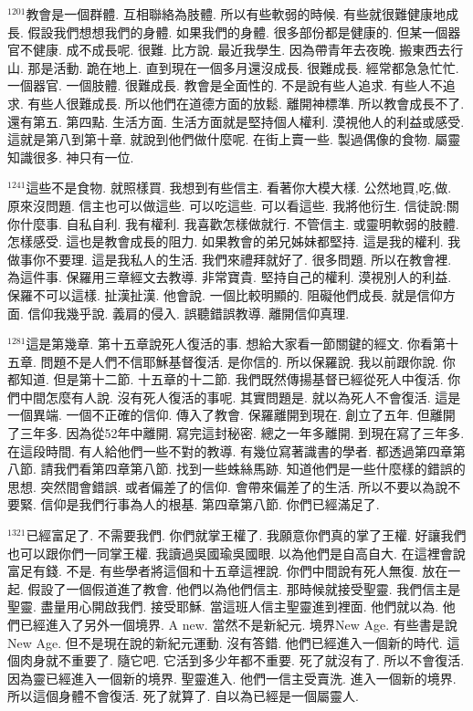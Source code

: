 \documentclass{book}
\begin{document}
$^{1201}$教會是一個群體.
互相聯絡為肢體.
所以有些軟弱的時候.
有些就很難健康地成長.
假設我們想想我們的身體.
如果我們的身體.
很多部份都是健康的.
但某一個器官不健康.
成不成長呢.
很難.
比方說.
最近我學生.
因為帶青年去夜晚.
搬東西去行山.
那是活動.
跪在地上.
直到現在一個多月還沒成長.
很難成長.
經常都急急忙忙.
一個器官.
一個肢體.
很難成長.
教會是全面性的.
不是說有些人追求.
有些人不追求.
有些人很難成長.
所以他們在道德方面的放鬆.
離開神標準.
所以教會成長不了.
還有第五.
第四點.
生活方面.
生活方面就是堅持個人權利.
漠視他人的利益或感受.
這就是第八到第十章.
就說到他們做什麼呢.
在街上賣一些.
製過偶像的食物.
屬靈知識很多.
神只有一位.

$^{1241}$這些不是食物.
就照樣買.
我想到有些信主.
看著你大模大樣.
公然地買,吃,做.
原來沒問題.
信主也可以做這些.
可以吃這些.
可以看這些.
我將他衍生.
信徒說:關你什麼事.
自私自利.
我有權利.
我喜歡怎樣做就行.
不管信主.
或靈明軟弱的肢體.
怎樣感受.
這也是教會成長的阻力.
如果教會的弟兄姊妹都堅持.
這是我的權利.
我做事你不要理.
這是我私人的生活.
我們來禮拜就好了.
很多問題.
所以在教會裡.
為這件事.
保羅用三章經文去教導.
非常寶貴.
堅持自己的權利.
漠視別人的利益.
保羅不可以這樣.
扯漢扯漢.
他會說.
一個比較明顯的.
阻礙他們成長.
就是信仰方面.
信仰我幾乎說.
義肩的侵入.
誤聽錯誤教導.
離開信仰真理.

$^{1281}$這是第幾章.
第十五章說死人復活的事.
想給大家看一節關鍵的經文.
你看第十五章.
問題不是人們不信耶穌基督復活.
是你信的.
所以保羅說.
我以前跟你說.
你都知道.
但是第十二節.
十五章的十二節.
我們既然傳揚基督已經從死人中復活.
你們中間怎麼有人說.
沒有死人復活的事呢.
其實問題是.
就以為死人不會復活.
這是一個異端.
一個不正確的信仰.
傳入了教會.
保羅離開到現在.
創立了五年.
但離開了三年多.
因為從52年中離開.
寫完這封秘密.
總之一年多離開.
到現在寫了三年多.
在這段時間.
有人給他們一些不對的教導.
有幾位寫著識書的學者.
都透過第四章第八節.
請我們看第四章第八節.
找到一些蛛絲馬跡.
知道他們是一些什麼樣的錯誤的思想.
突然間會錯誤.
或者偏差了的信仰.
會帶來偏差了的生活.
所以不要以為說不要緊.
信仰是我們行事為人的根基.
第四章第八節.
你們已經滿足了.

$^{1321}$已經富足了.
不需要我們.
你們就掌王權了.
我願意你們真的掌了王權.
好讓我們也可以跟你們一同掌王權.
我讀過吳國瑜吳國眼.
以為他們是自高自大.
在這裡會說富足有錢.
不是.
有些學者將這個和十五章這裡說.
你們中間說有死人無復.
放在一起.
假設了一個假道進了教會.
他們以為他們信主.
那時候就接受聖靈.
我們信主是聖靈.
盡量用心開啟我們.
接受耶穌.
當這班人信主聖靈進到裡面.
他們就以為.
他們已經進入了另外一個境界.
A new.
當然不是新紀元.
境界New Age.
有些書是說New Age.
但不是現在說的新紀元運動.
沒有答錯.
他們已經進入一個新的時代.
這個肉身就不重要了.
隨它吧.
它活到多少年都不重要.
死了就沒有了.
所以不會復活.
因為靈已經進入一個新的境界.
聖靈進入.
他們一信主受賣洗.
進入一個新的境界.
所以這個身體不會復活.
死了就算了.
自以為已經是一個屬靈人.
\end{document}
